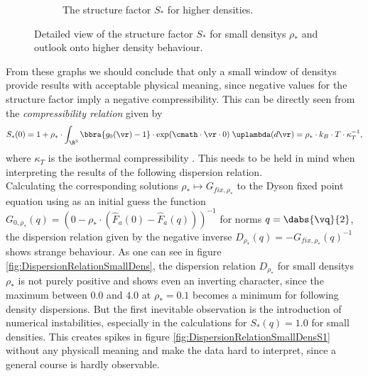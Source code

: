 \begin{figure}[H]
\begin{subfigure}[t]{\textwidth}
        \caption{The structure factor $S_*$ for higher densities.}
        \label{fig:StructureFactorHighDensS2}
    \end{subfigure}
    \caption{Detailed view of the structure factor $S_*$ for small densitys $\rho_*$ and outlook onto higher density behaviour.}
    \label{fig:StructureFactorSmallDens}
\end{figure}
From these graphs we should conclude that only a small window of densitys provide results with acceptable physical meaning, since negative values for the structure factor imply a negative compressibility. This can be directly seen from the \emph{compressibility relation} given by
\[
    S_*(0) = 1 + \rho_*\cdot\int_{\R^3}\bbra{g_0(\vr) - 1}\cdot\exp(\cmath\cdot \vr\cdot 0)\;\uplambda(d\vr) = \rho_*\cdot k_B\cdot T\cdot\kappa_T^{-1},
\]
where $\kappa_T$ is the isothermal compressibility \cite{Hansen_McDonald_1979}. This needs to be held in mind when interpreting the results of the following dispersion relation. \\

Calculating the corresponding solutions $\rho_*\mapsto G_{\mathit{fix},\rho_*}$ to the Dyson fixed point equation using as an initial guess the function $G_{0,\rho_*}(q) = (0 - \rho_*\cdot(\hat F_a(0) - \hat F_a(q)))^{-1}$ for norms $q= \dabs{\vq}{2}$, the dispersion relation given by the negative inverse $D_{\rho_*}(q) = -G_{\mathit{fix},\rho_*}(q)^{-1}$ shows strange behaviour. As one can see in figure \ref{fig:DispersionRelationSmallDens}, the dispersion relation $D_{\rho_*}$ for small densitys $\rho_*$ is not purely positive and shows even an inverting character, since the maximum between $0.0$ and $4.0$ at $\rho_* = 0.1$ becomes a minimum for following density dispersions. But the first inevitable observation is the introduction of numerical instabilities, especially in the calculations for $S_*(q) = 1.0$ for small densities. This creates spikes in figure \ref{fig:DispersionRelationSmallDensS1} without any physicall meaning and make the data hard to interpret, since a general course is hardly observable. 

